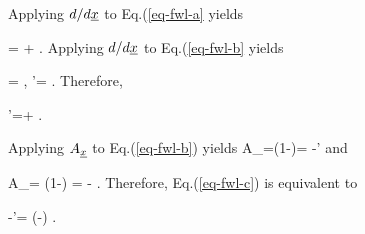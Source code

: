 Applying $d/d{\underline{x}}$ to Eq.(\ref{eq-fwl-a}
yields

\beq
{}=
\alp
+\beta{}
\;.
\eeq
Applying $d/d{\underline{x}}$ to Eq.(\ref{eq-fwl-b}
yields


\beq
\gamma=
\;,\;\;
\alp'=
\;.
\eeq
Therefore,

\beq
\alp'=\alp +\beta\gamma
\;.
\eeq

Applying $A_{\underline{x}}$ to Eq.(\ref{eq-fwl-b})
yields
\beq
A_\rvx\rvy=(1-\rvx{})\rvy=
\rvy-\alp'\rvx
\eeq
and

\beq
A_\rvx\rvd=
(1-\rvx{})\rvd
=
\rvd-\gamma\rvx
\;.
\eeq
Therefore, Eq.(\ref{eq-fwl-c})
is equivalent to

\beq
\rvy-\alpha'\rvx = \beta(\rvd-\gamma\rvx)
\;.
\eeq